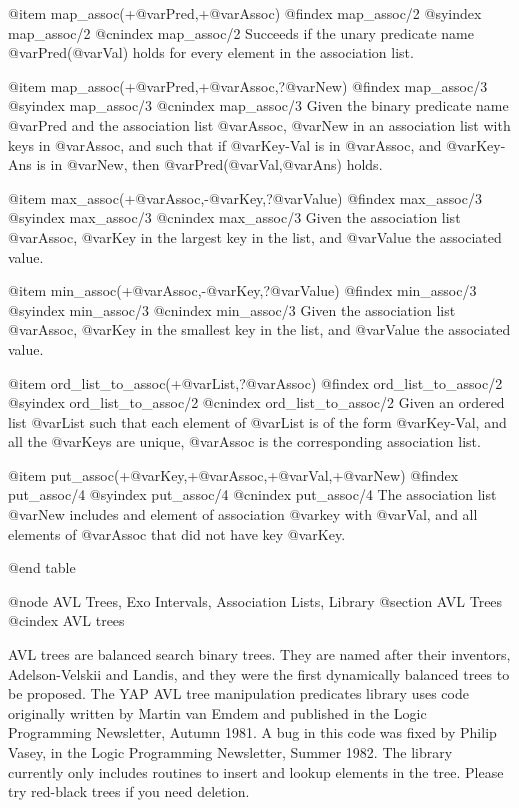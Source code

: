 @item map_assoc(+@var{Pred},+@var{Assoc})
@findex map_assoc/2
@syindex map_assoc/2
@cnindex map_assoc/2
Succeeds if the unary predicate name @var{Pred}(@var{Val}) holds for every
element in the association list.

@item map_assoc(+@var{Pred},+@var{Assoc},?@var{New})
@findex map_assoc/3
@syindex map_assoc/3
@cnindex map_assoc/3
Given the binary predicate name @var{Pred} and the association list
@var{Assoc}, @var{New} in an association list with keys in @var{Assoc},
and such that if @var{Key-Val} is in @var{Assoc}, and @var{Key-Ans} is in
@var{New}, then @var{Pred}(@var{Val},@var{Ans}) holds.

@item max_assoc(+@var{Assoc},-@var{Key},?@var{Value})
@findex max_assoc/3
@syindex max_assoc/3
@cnindex max_assoc/3
Given the association list
@var{Assoc}, @var{Key} in the largest key in the list, and @var{Value}
the associated value.

@item min_assoc(+@var{Assoc},-@var{Key},?@var{Value})
@findex min_assoc/3
@syindex min_assoc/3
@cnindex min_assoc/3
Given the association list
@var{Assoc}, @var{Key} in the smallest key in the list, and @var{Value}
the associated value.

@item ord_list_to_assoc(+@var{List},?@var{Assoc})
@findex ord_list_to_assoc/2
@syindex ord_list_to_assoc/2
@cnindex ord_list_to_assoc/2
Given an ordered list @var{List} such that each element of @var{List} is
of the form @var{Key-Val}, and all the @var{Keys} are unique, @var{Assoc} is
the corresponding association list.

@item put_assoc(+@var{Key},+@var{Assoc},+@var{Val},+@var{New})
@findex put_assoc/4
@syindex put_assoc/4
@cnindex put_assoc/4
The association list @var{New} includes and element of association
@var{key} with @var{Val}, and all elements of @var{Assoc} that did not
have key @var{Key}.

@end table

@node AVL Trees, Exo Intervals, Association Lists, Library
@section AVL Trees
@cindex AVL trees

AVL trees are balanced search binary trees. They are named after their
inventors, Adelson-Velskii and Landis, and they were the first
dynamically balanced trees to be proposed. The YAP AVL tree manipulation
predicates library uses code originally written by Martin van Emdem and
published in the Logic Programming Newsletter, Autumn 1981.  A bug in
this code was fixed by Philip Vasey, in the Logic Programming
Newsletter, Summer 1982. The library currently only includes routines to
insert and lookup elements in the tree. Please try red-black trees if
you need deletion.

